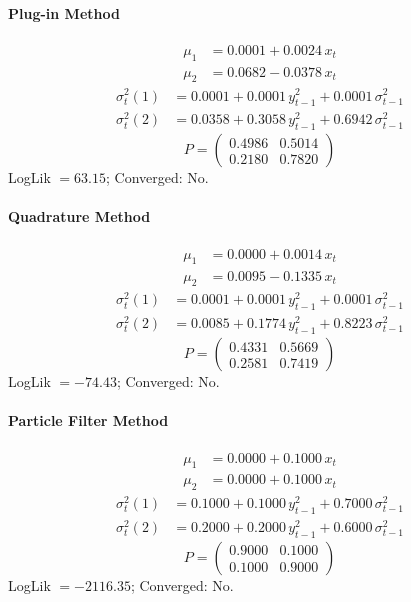 \documentclass[11pt, a4paper]{article}
\begin{document}
\paragraph{Plug-in Method}
\begin{align}
\mu_{1} &= 0.0001 + 0.0024\, x_t \\
\mu_{2} &= 0.0682 -0.0378\, x_t
\end{align}
\begin{align}
\sigma^2_{t}(1) &= 0.0001 + 0.0001\, y_{t-1}^2 + 0.0001\, \sigma^2_{t-1} \\
\sigma^2_{t}(2) &= 0.0358 + 0.3058\, y_{t-1}^2 + 0.6942\, \sigma^2_{t-1}
\end{align}
\begin{equation}
P = \begin{pmatrix} 0.4986 & 0.5014 \\ 0.2180 & 0.7820 \end{pmatrix}
\end{equation}
LogLik $= 63.15$; Converged: No.

\paragraph{Quadrature Method}
\begin{align}
\mu_{1} &= 0.0000 + 0.0014\, x_t \\
\mu_{2} &= 0.0095 -0.1335\, x_t
\end{align}
\begin{align}
\sigma^2_{t}(1) &= 0.0001 + 0.0001\, y_{t-1}^2 + 0.0001\, \sigma^2_{t-1} \\
\sigma^2_{t}(2) &= 0.0085 + 0.1774\, y_{t-1}^2 + 0.8223\, \sigma^2_{t-1}
\end{align}
\begin{equation}
P = \begin{pmatrix} 0.4331 & 0.5669 \\ 0.2581 & 0.7419 \end{pmatrix}
\end{equation}
LogLik $= -74.43$; Converged: No.

\paragraph{Particle Filter Method}
\begin{align}
\mu_{1} &= 0.0000 + 0.1000\, x_t \\
\mu_{2} &= 0.0000 + 0.1000\, x_t
\end{align}
\begin{align}
\sigma^2_{t}(1) &= 0.1000 + 0.1000\, y_{t-1}^2 + 0.7000\, \sigma^2_{t-1} \\
\sigma^2_{t}(2) &= 0.2000 + 0.2000\, y_{t-1}^2 + 0.6000\, \sigma^2_{t-1}
\end{align}
\begin{equation}
P = \begin{pmatrix} 0.9000 & 0.1000 \\ 0.1000 & 0.9000 \end{pmatrix}
\end{equation}
LogLik $= -2116.35$; Converged: No.
\end{document}
